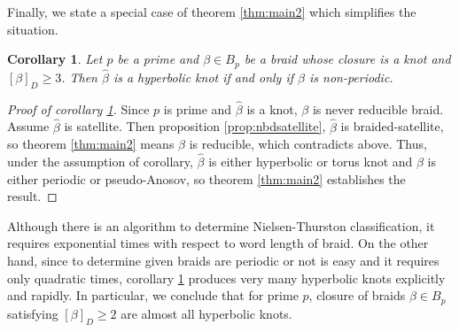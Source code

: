 \documentclass[12pt]{amsart}
\newtheorem{cor}{Corollary}
\begin{document}
 Finally, we state a special case of theorem \ref{thm:main2} which simplifies the situation.

\begin{cor}
\label{cor:c2}
Let $p$ be a prime and $\beta \in B_{p}$ be a braid whose closure is a knot and $[\beta]_{D}\geq 3$.
Then $\widehat{\beta}$ is a hyperbolic knot if and only if $\beta$ is non-periodic.
\end{cor}

\begin{proof}[Proof of corollary \ref{cor:c2}]
   Since $p$ is prime and $\widehat{\beta}$ is a knot, $\beta$ is never reducible braid.
   Assume $\widehat{\beta}$ is satellite. Then proposition \ref{prop:nbdsatellite}, $\widehat{\beta}$ is braided-satellite, so theorem \ref{thm:main2} means $\beta$ is reducible, which contradicts above. Thus, under the assumption of corollary, $\widehat{\beta}$ is either hyperbolic or torus knot and $\beta$ is either periodic or pseudo-Anosov, so theorem \ref{thm:main2} establishes the result. 
\end{proof}

   Although there is an algorithm to determine Nielsen-Thurston classification, it requires exponential times with respect to word length of braid. On the other hand, since to determine given braids are periodic or not is easy and it requires only quadratic times, corollary \ref{cor:c2} produces very many hyperbolic knots explicitly and rapidly. In particular, we conclude that for prime $p$, closure of braids $\beta \in B_{p}$ satisfying $[\beta]_{D} \geq 2$ are almost all hyperbolic knots. 
 
\end{document}
